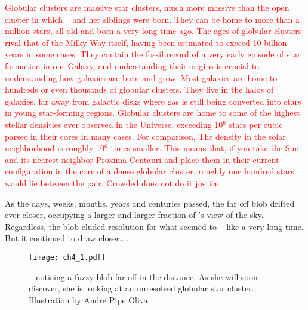 \documentclass[main.tex]{subfiles}
\begin{document}
\begin{tcolorbox}[sharp corners, colback=red!30, colframe=red!80!blue, title=Globular Clusters]
\par \textcolor{red} {Globular clusters are massive star clusters, much more massive than the open cluster in which \rmsterope~ and her siblings were born.  They can be home to more than a million stars, all old and born a very long time ago.  The ages of globular clusters rival that of the Milky Way itself, having been estimated to exceed 10 billion years in some cases.  They contain the fossil record of a very early episode of star formation in our Galaxy, and understanding their origins is crucial to understanding how galaxies are born and grow.  Most galaxies are home to hundreds or even thousands of globular clusters.  They live in the halos of galaxies, far away from galactic disks where gas is still being converted into stars in young star-forming regions.  Globular clusters are home to some of the highest stellar densities ever observed in the Universe, exceeding 10$^6$ stars per cubic parsec in their cores in many cases.  For comparison, The density in the solar neighborhood is roughly 10$^6$ times smaller.  This means that, if you take the Sun and its nearest neighbor Proxima Centauri and place them in their current configuration in the core of a dense globular cluster, roughly one hundred stars would lie between the pair.  Crowded does not do it justice.} 
\end{tcolorbox} 

\par \nar As the days, weeks, months, years and centuries passed, the far off blob drifted ever closer, occupying a larger and larger fraction of \rmsterope's view of the sky.  Regardless, the blob eluded resolution for what seemed to \rmsterope~ like a very long time.  But it continued to draw closer....

\begin{figure}
\texttt{[image: ch4\_1.pdf]}
\caption{\rmsterope~ noticing a fuzzy blob far off in the distance.  As she will soon discover, she is looking at an unresolved globular star cluster.  Illustration by Andre Pipe Oliva.
\label{fig:fig1}}
\end{figure}
\end{document}
